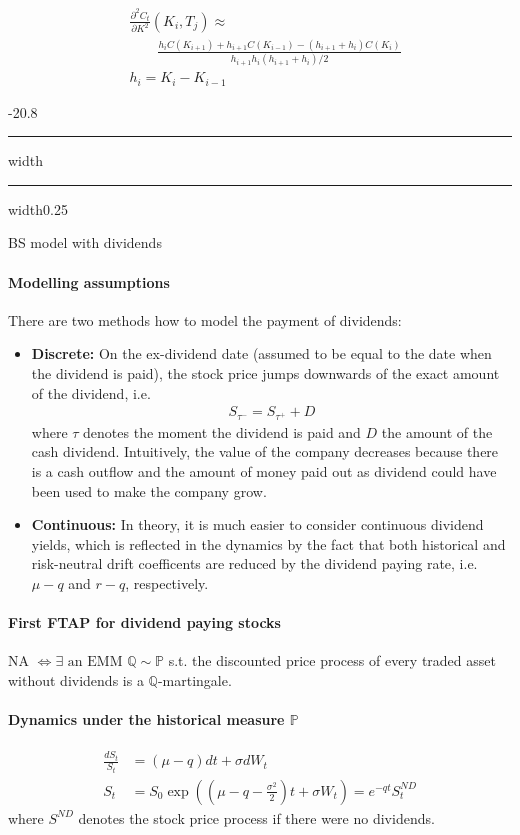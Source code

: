 \documentclass[a4paper,landscape,7pt,fleqn]{scrartcl}
\makeatletter
\renewcommand{\emph}[1]{\textbf{#1}}
\renewcommand{\subsection}{\@startsection{subsection}{1}{0mm}%
{-2\baselineskip}{0.8\baselineskip}%
{\hrule depth 0.2pt width\columnwidth\hrule depth0.75pt
width0.25\columnwidth\vspace*{1.2em}\large\bfseries}}
\makeatother
\begin{document}
\begin{multicols*}{3}
\begin{align*}
& \frac{\partial^2 C_t}{\partial K^2} (K_i, T_j) \approx \\
& \qquad \frac{h_i C(K_{i+1}) + h_{i+1} C(K_{i-1}) - (h_{i+1} + h_i) C(K_i)}{h_{i+1} h_i (h_{i+1} + h_i)/2} \\
& h_i = K_i - K_{i-1}
\end{align*}

\subsection{BS model with dividends}

\paragraph{Modelling assumptions}
There are two methods how to model the payment of dividends:
\begin{itemize}
\item \emph{Discrete:} On the ex-dividend date (assumed to be equal to the date when the dividend is paid), the stock price jumps downwards of the exact amount of the dividend, i.e.
\begin{align*}
S_{\tau^-} = S_{\tau^+} + D
\end{align*}
where $\tau$ denotes the moment the dividend is paid and $D$ the amount of the cash dividend. Intuitively, the value of the company decreases because there is a cash outflow and the amount of money paid out as dividend could have been used to make the company grow.
\item \emph{Continuous:} In theory, it is much easier to consider continuous dividend yields, which is reflected in the dynamics by the fact that both historical and risk-neutral drift coefficents are reduced by the dividend paying rate, i.e. $\mu-q$ and $r-q$, respectively.
\end{itemize}

\paragraph{First FTAP for dividend paying stocks}
NA $\iff \exists \text{ an EMM } \mathbb{Q} \sim \mathbb{P}$ s.t. the discounted price process of every traded asset without dividends is a $\mathbb{Q}$-martingale.

\paragraph{Dynamics under the historical measure $\mathbb{P}$}
\begin{align*}
\frac{dS_t}{S_t} &= (\mu - q) dt + \sigma dW_t \\
S_t &= S_0 \exp \left( \left( \mu - q - \frac{\sigma^2}{2} \right) t + \sigma W_t \right) = e^{-qt} S_t^{ND}
\end{align*}
where $S^{ND}$ denotes the stock price process if there were no dividends.


\end{multicols*}
\end{document}
